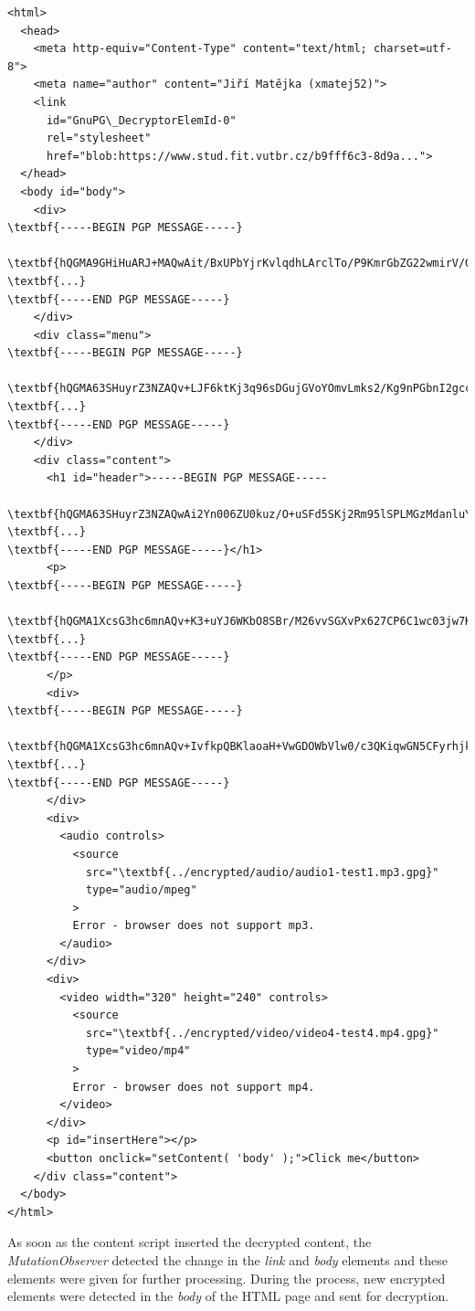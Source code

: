 \begin{Verbatim}[commandchars=\\\{\},codes={\catcode`$=3\catcode`_=8},samepage=false,frame=single]
<html>
  <head>
    <meta http-equiv="Content-Type" content="text/html; charset=utf-8">
    <meta name="author" content="Jiří Matějka (xmatej52)">
    <link
      id="GnuPG\_DecryptorElemId-0"
      rel="stylesheet"
      href="blob:https://www.stud.fit.vutbr.cz/b9fff6c3-8d9a...">
  </head>
  <body id="body">
    <div>
\textbf{-----BEGIN PGP MESSAGE-----}

\textbf{hQGMA9GHiHuARJ+MAQwAit/BxUPbYjrKvlqdhLArclTo/P9KmrGbZG22wmirV/G7}
\textbf{...}
\textbf{-----END PGP MESSAGE-----}
    </div>
    <div class="menu">
\textbf{-----BEGIN PGP MESSAGE-----}

\textbf{hQGMA63SHuyrZ3NZAQv+LJF6ktKj3q96sDGujGVoYOmvLmks2/Kg9nPGbnI2gccy}
\textbf{...}
\textbf{-----END PGP MESSAGE-----}
    </div>
    <div class="content">
      <h1 id="header">-----BEGIN PGP MESSAGE-----

\textbf{hQGMA63SHuyrZ3NZAQwAi2Yn006ZU0kuz/O+uSFd5SKj2Rm95lSPLMGzMdanluYM}
\textbf{...}
\textbf{-----END PGP MESSAGE-----}</h1>
      <p>
\textbf{-----BEGIN PGP MESSAGE-----}

\textbf{hQGMA1XcsG3hc6mnAQv+K3+uYJ6WKbO8SBr/M26vvSGXvPx627CP6C1wc03jw7Kw}
\textbf{...}
\textbf{-----END PGP MESSAGE-----}
      </p>
      <div>
\textbf{-----BEGIN PGP MESSAGE-----}

\textbf{hQGMA1XcsG3hc6mnAQv+IvfkpQBKlaoaH+VwGDOWbVlw0/c3QKiqwGN5CFyrhjkL}
\textbf{...}
\textbf{-----END PGP MESSAGE-----}
      </div>
      <div>
        <audio controls>
          <source
            src="\textbf{../encrypted/audio/audio1-test1.mp3.gpg}"
            type="audio/mpeg"
          >
          Error - browser does not support mp3.
        </audio>
      </div>
      <div>
        <video width="320" height="240" controls>
          <source
            src="\textbf{../encrypted/video/video4-test4.mp4.gpg}"
            type="video/mp4"
          >
          Error - browser does not support mp4.
        </video>
      </div>
      <p id="insertHere"></p>
      <button onclick="setContent( 'body' );">Click me</button>
    </div class="content">
  </body>
</html>
\end{Verbatim}

As soon as the content script inserted the decrypted content, the \textit{MutationObserver} detected the change in the \textit{link} and \textit{body} elements and these elements were given for further processing. During the process, new encrypted elements were detected in the \textit{body} of the HTML page and sent for decryption.

